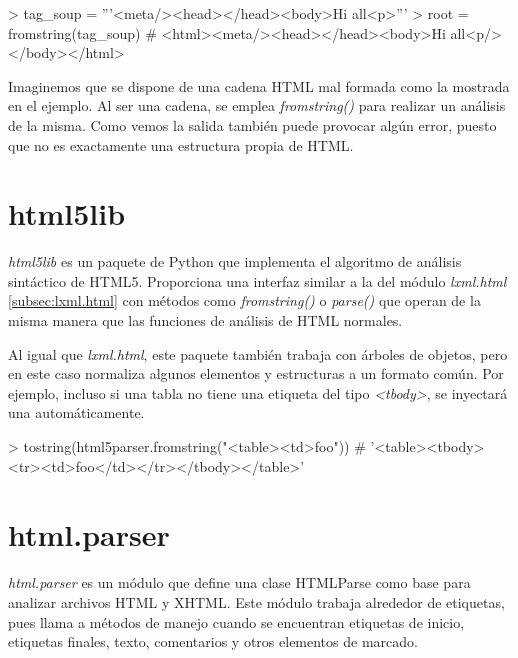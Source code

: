 \begin{Schunk}
    \begin{Soutput}
        > tag_soup = '''<meta/><head></head><body>Hi all<p>'''
        > root = fromstring(tag_soup)
        # <html><meta/><head></head><body>Hi all<p/></body></html>
    \end{Soutput}
\end{Schunk}

Imaginemos que se dispone de una cadena HTML mal formada como la mostrada en el ejemplo. Al ser una cadena,
se emplea \emph{fromstring()} para realizar un análisis de la misma. Como vemos la salida también puede
provocar algún error, puesto que no es exactamente una estructura propia de HTML.

\section{html5lib}
\label{sec:html5lib}

\emph{html5lib} \cite{html5lib} es un paquete de Python que implementa el algoritmo de análisis sintáctico 
de HTML5. Proporciona una interfaz similar a la del módulo \emph{lxml.html} \ref{subsec:lxml.html} con 
métodos como \emph{fromstring()} o \emph{parse()} que operan de la misma manera que las funciones de análisis 
de HTML normales.

Al igual que \emph{lxml.html}, este paquete también trabaja con árboles de objetos, pero en este caso 
normaliza algunos elementos y estructuras a un formato común. Por ejemplo, incluso si una tabla no tiene 
una etiqueta del tipo \emph{<tbody>}, se inyectará una automáticamente.

\begin{Schunk}
    \begin{Soutput}
        > tostring(html5parser.fromstring("<table><td>foo"))
        # '<table><tbody><tr><td>foo</td></tr></tbody></table>'
    \end{Soutput}
\end{Schunk}

\section{html.parser}
\label{sec:html.parser}

\emph{html.parser} \cite{html-parser} es un módulo que define una clase HTMLParse como base para analizar
archivos HTML y XHTML. Este módulo trabaja alrededor de etiquetas, pues llama a métodos de manejo cuando
se encuentran etiquetas de inicio, etiquetas finales, texto, comentarios y otros elementos de marcado.

